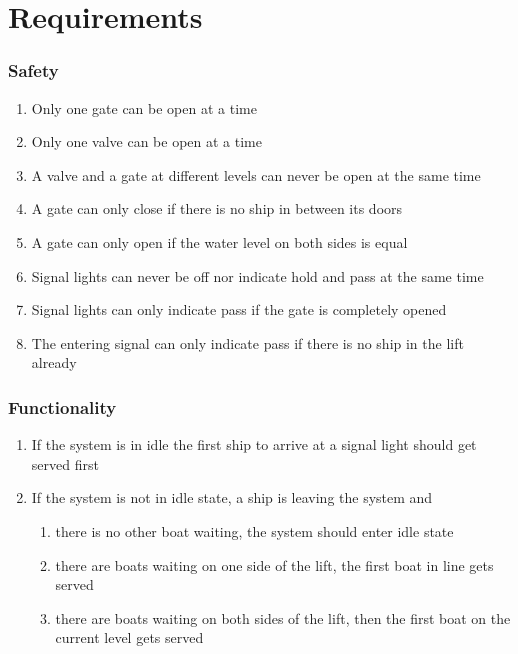 \section{Requirements}
\subsubsection*{Safety}
\begin{enumerate}
	\item Only one gate can be open at a time
	\item Only one valve can be open at a time
	\item A valve and a gate at different levels can never be open at the same time
	\item A gate can only close if there is no ship in between its doors
	\item A gate can only open if the water level on both sides is equal
	\item Signal lights can never be off nor indicate hold and pass at the same time
	\item Signal lights can only indicate pass if the gate is completely opened
	\item The entering signal can only indicate pass if there is no ship in the lift already
\end{enumerate}
	
\subsubsection*{Functionality}
\begin{enumerate}
	\item If the system is in idle the first ship to arrive at a signal light should get served first
	\item If the system is not in idle state, a ship is leaving the system and
	\begin{enumerate}
		\item there is no other boat waiting, the system should enter idle state
		\item there are boats waiting on one side of the lift, the first boat in line gets served 
		\item there are boats waiting on both sides of the lift, then the first boat on the current level gets served
	\end{enumerate}
\end{enumerate}
